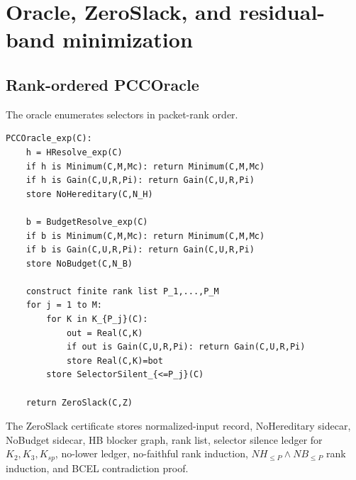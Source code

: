 \documentclass[10.5pt,a4paper]{article}
\begin{document}
\section{Oracle, ZeroSlack, and residual-band minimization}

\subsection{Rank-ordered PCCOracle}
The oracle enumerates selectors in packet-rank order.

\begin{lstlisting}
PCCOracle_exp(C):
    h = HResolve_exp(C)
    if h is Minimum(C,M,Mc): return Minimum(C,M,Mc)
    if h is Gain(C,U,R,Pi): return Gain(C,U,R,Pi)
    store NoHereditary(C,N_H)

    b = BudgetResolve_exp(C)
    if b is Minimum(C,M,Mc): return Minimum(C,M,Mc)
    if b is Gain(C,U,R,Pi): return Gain(C,U,R,Pi)
    store NoBudget(C,N_B)

    construct finite rank list P_1,...,P_M
    for j = 1 to M:
        for K in K_{P_j}(C):
            out = Real(C,K)
            if out is Gain(C,U,R,Pi): return Gain(C,U,R,Pi)
            store Real(C,K)=bot
        store SelectorSilent_{<=P_j}(C)

    return ZeroSlack(C,Z)
\end{lstlisting}

The ZeroSlack certificate stores normalized-input record, NoHereditary sidecar, NoBudget sidecar, HB blocker graph, rank list, selector silence ledger for \(K_2,K_3,K_{sp}\), no-lower ledger, no-faithful rank induction, \(NH_{\le P}\wedge NB_{\le P}\) rank induction, and BCEL contradiction proof.
\end{document}
